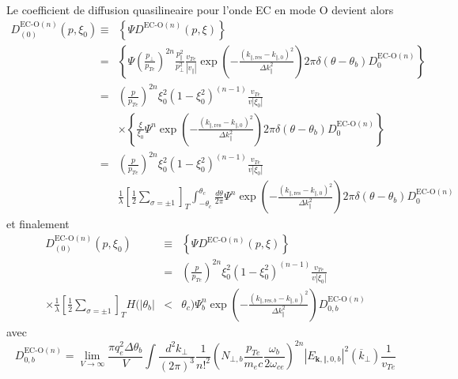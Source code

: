Le coefficient de diffusion quasilineaire pour l'onde EC en mode O
devient alors \begin{eqnarray*}
D_{(0)}^{\text{EC-O}(n)}(p,\xi_{0}) & \equiv & \left\{ \Psi D^{\text{EC-O}(n)}(p,\xi)\right\} \\
 & = & \left\{ \Psi\left(\frac{p_{\bot}}{p_{Te}}\right)^{2n}\frac{p_{\Vert}^{2}}{p_{\bot}^{2}}\frac{v_{Te}}{\left|v_{\Vert}\right|}\exp\left(-\frac{\left(k_{\Vert,\text{res}}-k_{\Vert,0}\right)^{2}}{\Delta k_{\Vert}^{2}}\right)2\pi\delta(\theta-\theta_{b})D_{0}^{\text{EC-O}(n)}\right\} \\
 & = & \left(\frac{p}{p_{Te}}\right)^{2n}\xi_{0}^{2}\left(1-\xi_{0}^{2}\right)^{(n-1)}\frac{v_{Te}}{v|\xi_{0}|}\\
 &  & \times\left\{ \frac{\xi}{\xi_{0}}\Psi^{n}\exp\left(-\frac{\left(k_{\Vert,\text{res}}-k_{\Vert,0}\right)^{2}}{\Delta k_{\Vert}^{2}}\right)2\pi\delta(\theta-\theta_{b})D_{0}^{\text{EC-O}(n)}\right\} \\
 & = & \left(\frac{p}{p_{Te}}\right)^{2n}\xi_{0}^{2}\left(1-\xi_{0}^{2}\right)^{(n-1)}\frac{v_{Te}}{v|\xi_{0}|}\\
 &  & \frac{1}{\lambda}\left[\frac{1}{2}\sum_{\sigma=\pm1}\right]_{T}\int_{-\theta_{c}}^{\theta_{c}}\frac{d\theta}{2\pi}\Psi^{n}\exp\left(-\frac{\left(k_{\Vert,\text{res}}-k_{\Vert,0}\right)^{2}}{\Delta k_{\Vert}^{2}}\right)2\pi\delta(\theta-\theta_{b})D_{0}^{\text{EC-O}(n)}\end{eqnarray*}
 et finalement \begin{eqnarray*}
D_{(0)}^{\text{EC-O}(n)}(p,\xi_{0}) & \equiv & \left\{ \Psi D^{\text{EC-O}(n)}(p,\xi)\right\} \\
 & = & \left(\frac{p}{p_{Te}}\right)^{2n}\xi_{0}^{2}\left(1-\xi_{0}^{2}\right)^{(n-1)}\frac{v_{Te}}{v|\xi_{0}|}\\
\times\frac{1}{\lambda}\left[\frac{1}{2}\sum_{\sigma=\pm1}\right]_{T}H(|\theta_{b}| & < & \theta_{c})\Psi_{b}^{n}\exp\left(-\frac{\left(k_{\Vert,\text{res},b}-k_{\Vert,0}\right)^{2}}{\Delta k_{\Vert}^{2}}\right)D_{0,b}^{\text{EC-O}(n)}\end{eqnarray*}
 avec \[
D_{0,b}^{\text{EC-O}(n)}=\lim_{V\rightarrow\infty}\frac{\pi q_{e}^{2}\Delta\theta_{b}}{V}\int\frac{d^{2}k_{\bot}}{(2\pi)^{3}}\frac{1}{n!^{2}}\left(N_{\bot,b}\frac{p_{Te}}{m_{e}c}\frac{\omega_{b}}{2\omega_{ce}}\right)^{2n}\left|E_{\mathbf{k},\Vert,0,b}\right|^{2}(\overline{k}_{\bot})\frac{1}{v_{Te}}\]

